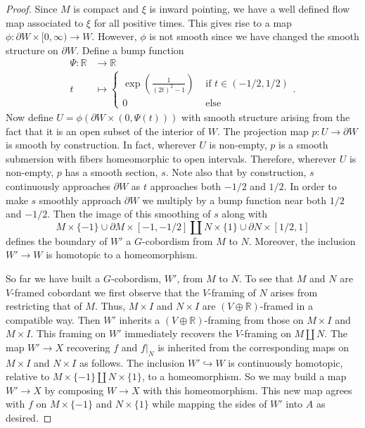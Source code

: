 \documentclass[11pt]{amsart}
\newcommand{\R}{\mathbb R}
\theoremstyle{plain}   %
\theoremstyle{definition}
\theoremstyle{remark}
\numberwithin{equation}{section}
\begin{document}
\begin{proof}
Since $M$ is compact and $\xi$ is inward pointing, we have a well defined flow map associated to $\xi$ for all positive times. This gives rise to a map $\phi:\partial W\times [0,\infty)\to W$. However, $\phi$ is not smooth since we have changed the smooth structure on $\partial W$. Define a bump function
\begin{align*}
\Psi:\R&\to \R\\
t & \mapsto \begin{cases}
\exp\left(\tfrac{1}{(2t)^2-1}\right) & \text{ if $t\in (-1/2,1/2)$}\\
0 & \text{ else }
\end{cases}.
\end{align*} Now define $U=\phi(\partial W\times (0,\Psi(t)))$ with smooth structure arising from the fact that it is an open subset of the interior of $W$. The projection map $p:U\to \partial W$ is smooth by construction. In fact, wherever $U$ is non-empty, $p$ is a smooth submersion with fibers homeomorphic to open intervals. Therefore, wherever $U$ is non-empty, $p$ has a smooth section, $s$. Note also that by construction, $s$ continuously approaches $\partial W$ as $t$ approaches both $-1/2$ and $1/2$. In order to make $s$ smoothly approach $\partial W$ we multiply by a bump function near both $1/2$ and $-1/2$. Then the image of this smoothing of $s$ along with 
\[
M\times\{-1\}\cup\partial M\times[-1,-1/2] \amalg N\times\{1\}\cup \partial N\times[1/2,1]
\]
defines the boundary of $W'$ a $G$-cobordism from $M$ to $N$. Moreover, the inclusion $W'\to W$ is homotopic to a homeomorphism. 

So far we have built a $G$-cobordism, $W'$, from $M$ to $N$. To see that $M$ and $N$ are $V$-framed cobordant we first observe that the $V$-framing of $N$ arises from restricting that of $M$. Thus, $M\times I$ and $N\times I$ are $(V\oplus\R)$-framed in a compatible way. Then $W'$ inherits a $(V\oplus\R)$-framing from those on $M\times I$ and $M\times I$. This framing on $W'$ immediately recovers the $V$-framing on $M\amalg N$. The map $W'\to X$ recovering $f$ and $f|_N$ is inherited from the corresponding maps on $M\times I$ and $N\times I$ as follows. The inclusion $W'\hookrightarrow W$ is continuously homotopic, relative to $M\times\{-1\}\amalg N\times\{1\}$, to a homeomorphism. So we may build a map $W'\to X$ by composing $W\to X$ with this homeomorphism.  This new map agrees with $f$ on $M\times\{-1\}$ and $N\times\{1\}$ while mapping the sides of $W'$ into $A$ as desired.
\end{proof}
\end{document}
